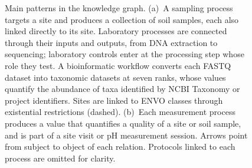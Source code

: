 \begin{figure}[!htbp]
{}
\caption{Main patterns in the knowledge graph. (a)~A sampling process
targets a site and produces a collection of soil samples, each also linked
directly to its site. Laboratory processes are connected through their
inputs and outputs, from DNA extraction to sequencing; laboratory controls
enter at the processing step whose role they test. A bioinformatic
workflow converts each FASTQ dataset into taxonomic datasets at seven
ranks, whose values quantify the abundance of taxa identified by NCBI
Taxonomy or project identifiers. Sites are linked to ENVO classes through
existential restrictions (dashed). (b)~Each measurement process produces a
value that quantifies a quality of a site or soil sample, and is part of
a site visit or pH measurement session. Arrows point from subject to
object of each relation. Protocols linked to each process are omitted for
clarity.}
\label{fig:kg_model}
\end{figure}